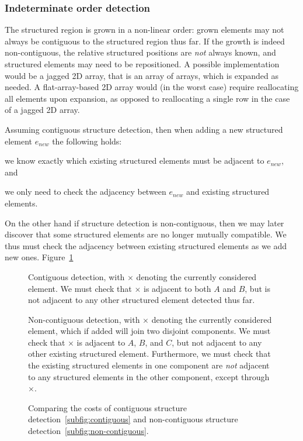 \subsubsection{Indeterminate order detection}
The structured region is grown in a non-linear order: grown elements may not always be contiguous to the structured region thus far. If the growth is indeed non-contiguous, the relative structured positions are \emph{not} always known, and structured elements may need to be repositioned. A possible implementation would be a jagged 2D array, that is an array of arrays, which is expanded as needed. A flat-array-based 2D array would (in the worst case) require reallocating all elements upon expansion, as opposed to reallocating a single row in the case of a jagged 2D array.

Assuming contiguous structure detection, then when adding a new structured element $e_{new}$ the following holds:
\begin{enumerate*}[label=\alph*)]
\item we know exactly which existing structured elements must be adjacent to $e_{new}$, and
\item we only need to check the adjacency between $e_{new}$ and existing structured elements.
\end{enumerate*}
On the other hand if structure detection is non-contiguous, then we may later discover that some structured elements are no longer mutually compatible. We thus must check the adjacency between existing structured elements as we add new ones. Figure~\ref{fig:contiguous-comparison}


\begin{figure}

\sidebysidevertical
{
\drawmatrix[cell wd=0.8, cell ht=0.8]{\contiguousmatrix}
\caption{Contiguous detection, with $\times$ denoting the currently considered element. We must check that $\times$ is adjacent to both $A$ and $B$, but is not adjacent to any other structured element detected thus far.}
\label{subfig:contiguous}
}
{
\drawmatrix[cell wd=0.8, cell ht=0.8]{\noncontiguousmatrix}
\caption{Non-contiguous detection, with $\times$ denoting the currently considered element, which if added will join two disjoint components. We must check that $\times$ is adjacent to $A$, $B$, and $C$, but not adjacent to any other existing structured element. Furthermore, we must check that the existing structured elements in one component are \emph{not} adjacent to any structured elements in the other component, except through $\times$.}
\label{subfig:non-contiguous}
}

\caption{Comparing the costs of contiguous structure detection~\ref{subfig:contiguous} and non-contiguous structure detection~\ref{subfig:non-contiguous}.}
\label{fig:contiguous-comparison}
\end{figure}


